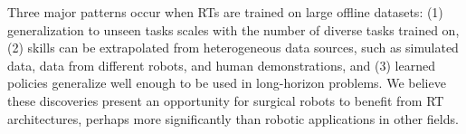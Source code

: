 \documentclass[fleqn,10pt]{wlscirep}\twocolumn
\begin{document}

Three major patterns occur when RTs are trained on large offline datasets\cite{reed2022generalist, brohan2022rt, brohan2023rt, open_x_embodiment_rt_x_2023, hu2023Toward}: (1) generalization to unseen tasks scales with the number of diverse tasks trained on, (2) skills can be extrapolated from heterogeneous data sources, such as simulated data, data from different robots, and human demonstrations, and (3) learned policies generalize well enough to be used in long-horizon problems. 
We believe these discoveries present an opportunity for surgical robots to benefit from RT architectures, perhaps more significantly than robotic applications in other fields.











\end{document}

